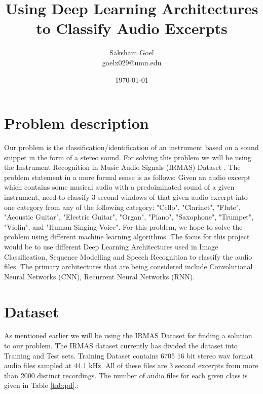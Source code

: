 \documentclass[11pt]{article}
\title{Using Deep Learning Architectures to Classify Audio Excerpts}
\author{
Saksham Goel\\goelx029@umn.edu
}
\date{\today}
\begin{document}
\maketitle

\section{Problem description}
Our problem is the classification/identification of an instrument based on a sound snippet in the form of a stereo sound. For solving this problem we will be using the Instrument Recognition in Music Audio Signals (IRMAS) Dataset \cite{bosch2012comparison}. The problem statement in a more formal sense is as follows: Given an audio excerpt which contains some musical audio with a predoiminated sound of a given instrument, need to classify 3 second windows of that given audio excerpt into one category from any of the following category: "Cello", "Clarinet", "Flute", "Acoustic Guitar", "Electric Guitar", "Organ", "Piano", "Saxophone", "Trumpet", "Violin", and "Human Singing Voice". For this problem, we hope to solve the problem using different machine learning algorithms. The focus for this project would be to use different Deep Learning Architectures used in Image Classification, Sequence Modelling and Speech Recognition to classify the audio files. The primary architectures that are being considered include Convolutional Neural Networks (CNN), Recurrent Neural Networks (RNN).

\section{Dataset}
As mentioned earlier we will be using the IRMAS Dataset for finding a solution to our problem. The IRMAS dataset currently has divided the dataset into Training and Test sets. Training Dataset contains 6705 16 bit stereo wav format audio files sampled at 44.1 kHz. All of these files are 3 second excerpts from more than 2000 distinct recordings. The number of audio files for each given class is given in Table \ref{tab:pd}.:
\end{document}

